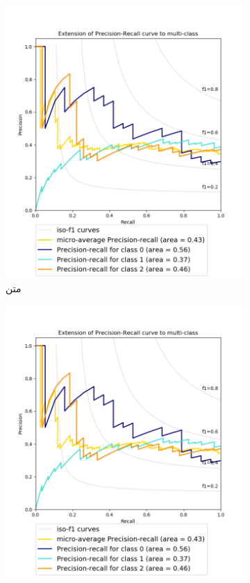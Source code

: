 \begin{figure}[htp]
	\centering
	\begin{subfigure}[b]{0.45\textwidth}
		\centering
		\includegraphics[width=\textwidth]{./Content/Chapter3/Chart/precision_recall.png}
		\caption{متن}
		\label{chart:precision_recall-1}
	\end{subfigure}
	\hfill
	\begin{subfigure}[b]{0.45\textwidth}
		\centering
		\includegraphics[width=\textwidth]{./Content/Chapter3/Chart/precision_recall.png}

\end{subfigure}
\end{figure}
